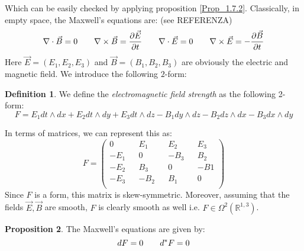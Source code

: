 \documentclass[12pt,a4paper]{report}
\theoremstyle{definition}
\newtheorem{Def}{Definition}[chapter]
\theoremstyle{Theorem}
\newtheorem{Prop}[Def]{Proposition}
\theoremstyle{definition}
\theoremstyle{definition}
\begin{document}
	Which can be easily checked by applying proposition \ref{Prop_1.7.2}.
	Classically, in empty space, the Maxwell's equations are: (see REFERENZA)
	\begin{equation}\label{M.E.}
		\nabla \cdot \vec{B} =0 \hspace{20 pt} \nabla \times \vec{B}={\partial \vec{E}\over \partial t}\hspace{20 pt}\nabla \cdot \vec{E} =0 \hspace{20 pt} \nabla \times \vec{E}=-{\partial \vec{B}\over \partial t}
	\end{equation}
	Here $\vec{E}=(E_1,E_2,E_3)$ and $\vec{B}=(B_1,B_2,B_3)$ are obviously the electric and magnetic field.
	We introduce the following $2$-form:
	\begin{Def}
		We define the \textit{electromagnetic  field strength} as the following 2-form:
		$$F=E_1 dt\wedge dx+E_2 dt\wedge dy+E_3 dt\wedge dz-B_1 dy\wedge dz-B_2 dz\wedge dx-B_3 dx\wedge dy$$
	\end{Def}
	In terms of matrices, we can represent this as:
	$$F=\begin{pmatrix}
		0 && E_1 && E_2 && E_3\\
		-E_1 && 0 && -B_3 && B_2\\
		-E_2 &&  B_3 && 0 && -B1\\
		-E_3 && -B_2 && B_1 && 0\\ 
	\end{pmatrix}$$
	Since $F$ is a form, this matrix is skew-symmetric. Moreover, assuming that the fields $\vec{E},\vec{B}$ are smooth, $F$ is clearly smooth as well i.e. $F\in\Omega^2(\mathbb{R}^{1,3})$.
	\begin{Prop}
		The Maxwell's equations are given by:
		$$dF=0\hspace{20 pt} d^*F=0$$
	\end{Prop}
\end{document}
